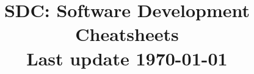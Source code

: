\usepackage{fancyhdr}
\pagestyle{fancy}

\renewcommand{\chaptermark}[1]{\markboth{#1}{}}
\fancyhf{}
\fancyhead[L]{
	\hmwkTitle
	}
\fancyfoot[C]{\thepage}


\renewcommand\headrulewidth{0.4pt} %
\renewcommand\footrulewidth{0.4pt} %

\setlength\parindent{0pt} %

\title{
\vspace{2in}
\textmd{\textbf{SDC: Software Development Cheatsheets}}\\
\normalsize\vspace{0.1in}\small{Last update \today}\\
\vspace{3in}
}

\author{\textbf{\hmwkAuthorName}}
\date{} %
